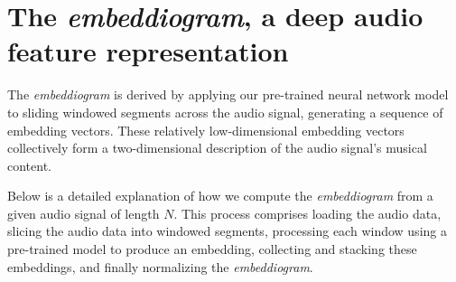 \section{The \textit{embeddiogram}, a deep audio feature representation}

The \textit{embeddiogram} is derived by applying our pre-trained neural network model to sliding windowed segments across the audio signal, generating a sequence of embedding vectors. These relatively low-dimensional embedding vectors collectively form a two-dimensional description of the audio signal's musical content.

Below is a detailed explanation of how we compute the \textit{embeddiogram} from a given audio signal of length $N$. This process comprises loading the audio data, slicing the audio data into windowed segments, processing each window using a pre-trained model to produce an embedding, collecting and stacking these embeddings, and finally normalizing the \textit{embeddiogram}. 

